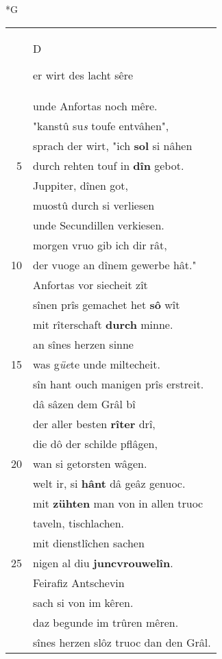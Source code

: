 \documentclass[8pt,a4paper,notitlepage]{article}
\begin{document}
\newpage
\begin{table}[ht]
\begin{minipage}[t]{0.5\linewidth}
\small
\begin{center}*G
\end{center}
\begin{tabular}{rl}
 & \begin{large}D\end{large}er wirt des lacht sêre\\ 
 & unde Anfortas noch mêre.\\ 
 & "kanstû su\textit{s} toufe entvâhen",\\ 
 & sprach der wirt, "ich \textbf{sol} si nâhen\\ 
5 & durch rehten touf in \textbf{dîn} gebot.\\ 
 & Juppiter, dînen got,\\ 
 & muostû durch si verliesen\\ 
 & unde Secundillen verkiesen.\\ 
 & morgen vruo gib ich dir rât,\\ 
10 & der vuoge an dînem gewerbe hât."\\ 
 & Anfortas vor siecheit zît\\ 
 & sînen prîs gemachet het \textbf{sô} wît\\ 
 & mit rîterschaft \textbf{durch} minne.\\ 
 & an sînes herzen sinne\\ 
15 & was g\textit{üe}te unde miltecheit.\\ 
 & sîn hant ouch manigen prîs erstreit.\\ 
 & dâ sâzen dem Grâl bî\\ 
 & der aller besten \textbf{rîter} drî,\\ 
 & die dô der schilde pflâgen,\\ 
20 & wan si getorsten wâgen.\\ 
 & welt ir, si \textbf{hânt} dâ geâz genuoc.\\ 
 & mit \textbf{zühten} man von in allen truoc\\ 
 & taveln, tischlachen.\\ 
 & mit dienstlîchen sachen\\ 
25 & nigen al diu \textbf{juncvrouwelîn}.\\ 
 & Feirafiz Antschevin\\ 
 & sach si von im kêren.\\ 
 & daz begunde im trûren mêren.\\ 
 & sînes herzen slôz truoc dan den Grâl.\\ 

\end{tabular}
\end{minipage}
\end{table}
\end{document}
